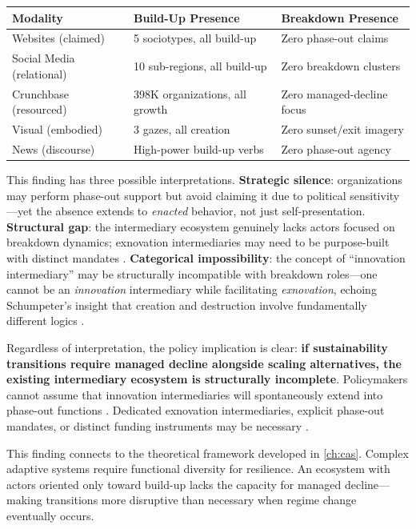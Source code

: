 \documentclass[../main.tex]{subfiles}
\begin{document}
\begin{center}
\small
\begin{tabular}{@{}p{2.8cm}p{3.5cm}p{4.5cm}@{}}
\toprule
\textbf{Modality} & \textbf{Build-Up Presence} & \textbf{Breakdown Presence} \\
\midrule
Websites (claimed) & 5 sociotypes, all build-up & Zero phase-out claims \\
Social Media (relational) & 10 sub-regions, all build-up & Zero breakdown clusters \\
Crunchbase (resourced) & 398K organizations, all growth & Zero managed-decline focus \\
Visual (embodied) & 3 gazes, all creation & Zero sunset/exit imagery \\
News (discourse) & High-power build-up verbs & Zero phase-out agency \\
\bottomrule
\end{tabular}
\label{tab:phaseout-gap}
\end{center}

This finding has three possible interpretations. \textbf{Strategic silence}: organizations may perform phase-out support but avoid claiming it due to political sensitivity---yet the absence extends to \emph{enacted} behavior, not just self-presentation. \textbf{Structural gap}: the intermediary ecosystem genuinely lacks actors focused on breakdown dynamics; exnovation intermediaries may need to be purpose-built with distinct mandates \parencite{rosenbloom2020deliberate}. \textbf{Categorical impossibility}: the concept of ``innovation intermediary'' may be structurally incompatible with breakdown roles---one cannot be an \emph{innovation} intermediary while facilitating \emph{exnovation}, echoing Schumpeter's insight that creation and destruction involve fundamentally different logics \parencite{schumpeter1942capitalism}.

Regardless of interpretation, the policy implication is clear: \textbf{if sustainability transitions require managed decline alongside scaling alternatives, the existing intermediary ecosystem is structurally incomplete}. Policymakers cannot assume that innovation intermediaries will spontaneously extend into phase-out functions \parencite{johnstone2020destabilisation}. Dedicated exnovation intermediaries, explicit phase-out mandates, or distinct funding instruments may be necessary \parencite{rinscheid2021phaseout}.

This finding connects to the theoretical framework developed in \cref{ch:cas}. Complex adaptive systems require functional diversity for resilience. An ecosystem with actors oriented only toward build-up lacks the capacity for managed decline---making transitions more disruptive than necessary when regime change eventually occurs.
\end{document}
